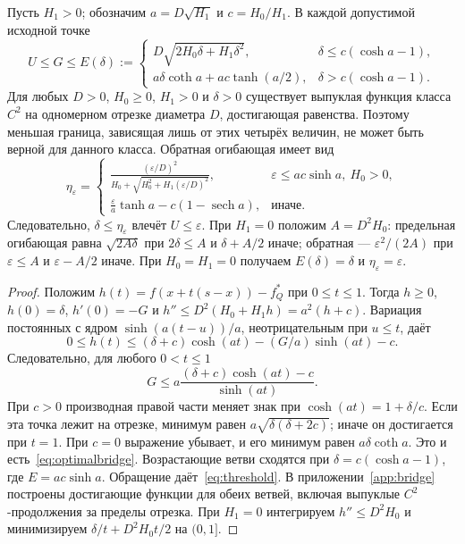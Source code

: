\begin{theorem}\label{lem:bridge}
Пусть $H_1>0$; обозначим $a=D\sqrt{H_1}$ и $c=H_0/H_1$.
В каждой допустимой исходной точке
\begin{equation}\label{eq:optimalbridge}
 U\le G\le E(\delta):=
 \begin{cases}
 D\sqrt{2H_0\delta+H_1\delta^2},&\delta\le c(\cosh a-1),\\
 a\delta\coth a+ac\tanh(a/2),&\delta>c(\cosh a-1).
 \end{cases}
\end{equation}
Для любых $D>0$, $H_0\ge0$, $H_1>0$ и $\delta>0$ существует
выпуклая функция класса $C^2$ на одномерном отрезке диаметра $D$,
достигающая равенства. Поэтому меньшая граница, зависящая лишь от
этих четырёх величин, не может быть верной для данного класса.
Обратная огибающая имеет вид
\begin{equation}\label{eq:threshold}
 \eta_\varepsilon=
 \begin{cases}
 \displaystyle\frac{(\varepsilon/D)^2}
 {H_0+\sqrt{H_0^2+H_1(\varepsilon/D)^2}},
       &\varepsilon\le ac\sinh a,\ H_0>0,\\[6pt]
 \displaystyle\frac{\varepsilon}{a}\tanh a-c(1-\operatorname{sech}a),
       &\text{иначе}.
 \end{cases}
\end{equation}
Следовательно, $\delta\le\eta_\varepsilon$ влечёт $U\le\varepsilon$.
При $H_1=0$ положим $A=D^2H_0$: предельная огибающая равна
$\sqrt{2A\delta}$ при $2\delta\le A$ и $\delta+A/2$ иначе;
обратная — $\varepsilon^2/(2A)$ при $\varepsilon\le A$ и
$\varepsilon-A/2$ иначе. При $H_0=H_1=0$ получаем
$E(\delta)=\delta$ и $\eta_\varepsilon=\varepsilon$.
\end{theorem}
\begin{proof}
Положим $h(t)=f(x+t(s-x))-f_Q^*$ при $0\le t\le1$.
Тогда $h\ge0$, $h(0)=\delta$, $h'(0)=-G$ и
$h''\le D^2(H_0+H_1h)=a^2(h+c)$.
Вариация постоянных с ядром $\sinh(a(t-u))/a$, неотрицательным
при $u\le t$, даёт
\[
 0\le h(t)\le(\delta+c)\cosh(at)-(G/a)\sinh(at)-c.
\]
Следовательно, для любого $0<t\le1$
\[
 G\le a\frac{(\delta+c)\cosh(at)-c}{\sinh(at)}.
\]
При $c>0$ производная правой части меняет знак при
$\cosh(at)=1+\delta/c$. Если эта точка лежит на отрезке,
минимум равен $a\sqrt{\delta(\delta+2c)}$; иначе он достигается
при $t=1$. При $c=0$ выражение убывает, и его минимум равен
$a\delta\coth a$. Это и есть~\eqref{eq:optimalbridge}.
Возрастающие ветви сходятся при $\delta=c(\cosh a-1)$, где
$E=ac\sinh a$. Обращение даёт~\eqref{eq:threshold}.
В приложении~\ref{app:bridge} построены достигающие функции для
обеих ветвей, включая выпуклые $C^2$-продолжения за пределы отрезка.
При $H_1=0$ интегрируем $h''\le D^2H_0$ и минимизируем
$\delta/t+D^2H_0t/2$ на $(0,1]$.
\end{proof}

